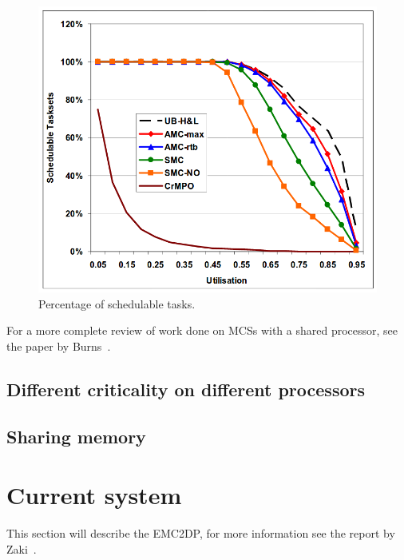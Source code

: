 \begin{figure}[H]
\centering
\includegraphics[width=\textwidth]{./img/literature_schedulers.png}
\caption{Percentage of schedulable tasks.~\cite{baruah2011}}\label{fig:schedulers}
\end{figure}

For a more complete review of work done on MCSs with a shared processor, see the paper by Burns~\cite{burns2016}.

\subsection{Different criticality on different processors}


\subsection{Sharing memory}

\section{Current system}
\label{sec:lit_emc2mcs}
This section will describe the EMC2DP, for more information see the report by Zaki~\cite{zaki2016}.

